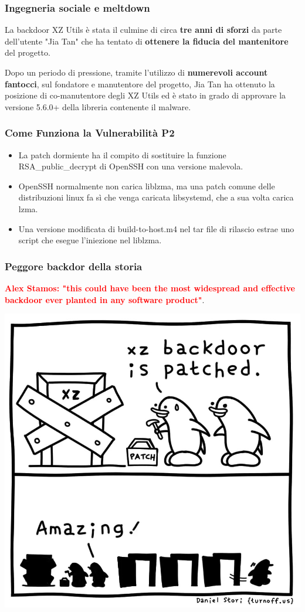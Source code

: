 \begin{frame}
\frametitle{Ingegneria sociale e meltdown}
La backdoor XZ Utils è stata il culmine di circa \textbf{tre anni di sforzi} da parte dell'utente "Jia Tan" che ha tentato di \textbf{ottenere la fiducia del mantenitore} del progetto.

\vspace{0.5 cm}

Dopo un periodo di pressione, tramite l'utilizzo di \textbf{numerevoli account fantocci}, sul fondatore e manutentore del progetto, Jia Tan ha ottenuto la posizione di co-manutentore degli XZ Utils ed è stato in grado di approvare la versione 5.6.0+ della libreria contenente il malware.

\end{frame}

\begin{frame}
    \frametitle{Come Funziona la Vulnerabilità P2}
    \begin{itemize}
        \item La patch dormiente ha il compito di sostituire la funzione RSA\_public\_decrypt di OpenSSH con una versione malevola.
        \item OpenSSH normalmente non carica liblzma, ma una patch comune delle distribuzioni linux fa sì che venga caricata libsystemd, che a sua volta carica lzma.
        \item Una versione modificata di build-to-host.m4 nel tar file di rilascio estrae uno script che esegue l'iniezione nel liblzma.
    \end{itemize}
\end{frame}

\begin{frame}
    \frametitle{Peggore backdor della storia}
    \textbf{\textcolor{red}{Alex Stamos: "this could have been the most widespread and effective backdoor ever planted in any software product"}}.

    \begin{center}
        \includegraphics[width=0.4\linewidth]{img/2-Introduction/xz-backdoor-patched.jpeg}
    \end{center}
\vspace{0.5 cm}

\end{frame}